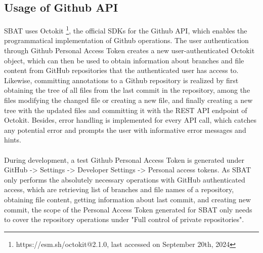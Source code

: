 \documentclass[12ptm a4paper]{article}
\begin{document}
\subsection{Usage of Github API}
SBAT uses Octokit \footnote{https://esm.sh/octokit@2.1.0, last accessed on September 20th, 2024}, the official SDKs for the Github API, which enables the programmatical implementation of Github operations. The user authentication through Github Personal Access Token creates a new user-authenticated Octokit object, which can then be used to obtain information about branches and file content from GitHub repositories that the authenticated user has access to. Likewise, committing annotations to a Github repository is realized by first obtaining the tree of all files from the last commit in the repository, among the files modifying the changed file or creating a new file, and finally creating a new tree with the updated files and committing it with the REST API endpoint of Octokit. Besides, error handling is implemented for every API call, which catches any potential error and prompts the user with informative error messages and hints.\\
\\
During development, a test Github Personal Access Token is generated under GitHub -> Settings -> Developer Settings -> Personal access tokens. As SBAT only performs the absolutely necessary operations with GitHub authenticated access, which are retrieving list of branches and file names of a repository, obtaining file content, getting information about last commit, and creating new commit, the scope of the Personal Access Token generated for SBAT only needs to cover the repository operations under "Full control of private repositories".
\newpage
\end{document}
